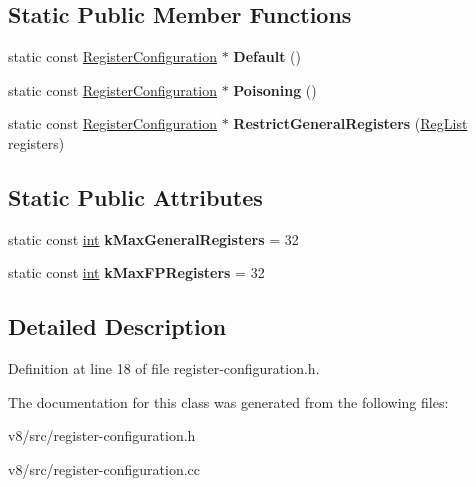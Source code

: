 \subsection*{Static Public Member Functions}
\begin{DoxyCompactItemize}
\item 
\mbox{\label{classv8_1_1internal_1_1RegisterConfiguration_a0c682fc3192984ae7fdf28c251d0216a}} 
static const \mbox{\hyperlink{classv8_1_1internal_1_1RegisterConfiguration}{Register\+Configuration}} $\ast$ {\bfseries Default} ()
\item 
\mbox{\label{classv8_1_1internal_1_1RegisterConfiguration_a8f3b8383637e737045f825744c71ac54}} 
static const \mbox{\hyperlink{classv8_1_1internal_1_1RegisterConfiguration}{Register\+Configuration}} $\ast$ {\bfseries Poisoning} ()
\item 
\mbox{\label{classv8_1_1internal_1_1RegisterConfiguration_a34a5b16ff76600d7197b390fb4f94aae}} 
static const \mbox{\hyperlink{classv8_1_1internal_1_1RegisterConfiguration}{Register\+Configuration}} $\ast$ {\bfseries Restrict\+General\+Registers} (\mbox{\hyperlink{classuint32__t}{Reg\+List}} registers)
\end{DoxyCompactItemize}
\subsection*{Static Public Attributes}
\begin{DoxyCompactItemize}
\item 
\mbox{\label{classv8_1_1internal_1_1RegisterConfiguration_a3b10debb30305d9a271e6f8fd3799358}} 
static const \mbox{\hyperlink{classint}{int}} {\bfseries k\+Max\+General\+Registers} = 32
\item 
\mbox{\label{classv8_1_1internal_1_1RegisterConfiguration_ab9d7bc028391a2aac45f1cbebbba8118}} 
static const \mbox{\hyperlink{classint}{int}} {\bfseries k\+Max\+F\+P\+Registers} = 32
\end{DoxyCompactItemize}


\subsection{Detailed Description}


Definition at line 18 of file register-\/configuration.\+h.



The documentation for this class was generated from the following files\+:\begin{DoxyCompactItemize}
\item 
v8/src/register-\/configuration.\+h\item 
v8/src/register-\/configuration.\+cc\end{DoxyCompactItemize}
